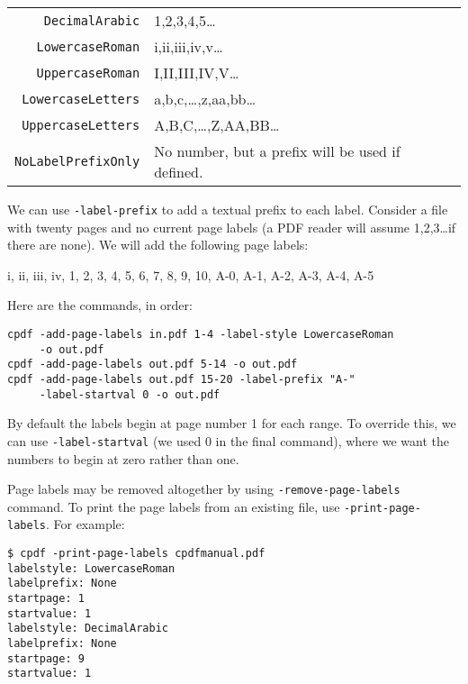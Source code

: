 \documentclass{book}
\begin{document}
\vspace{4mm}
{\small\begin{tabular}{rl}
  \texttt{DecimalArabic} & 1,2,3,4,5\ldots \\
  \texttt{LowercaseRoman} & i,ii,iii,iv,v\ldots \\
  \texttt{UppercaseRoman} & I,II,III,IV,V\ldots \\
  \texttt{LowercaseLetters} & a,b,c,\ldots,z,aa,bb\ldots \\
  \texttt{UppercaseLetters} & A,B,C,\ldots,Z,AA,BB\ldots \\
  \texttt{NoLabelPrefixOnly} & No number, but a prefix will be used if defined.
\end{tabular}}
\vspace{4mm}

\noindent We can use \texttt{-label-prefix} to add a textual prefix to each label. 
Consider a file with twenty pages and no current page labels (a PDF reader will assume 1,2,3\ldots if there are none). We will add the following page labels:

\vspace{4mm}
i, ii, iii, iv, 1, 2, 3, 4, 5, 6, 7, 8, 9, 10, A-0, A-1, A-2, A-3, A-4, A-5
\vspace{4mm}

\noindent Here are the commands, in order:

{\small\begin{framed}
  \noindent\verb!cpdf -add-page-labels in.pdf 1-4 -label-style LowercaseRoman!\\
  \noindent\verb!     -o out.pdf!\\
  
  \noindent\verb!cpdf -add-page-labels out.pdf 5-14 -o out.pdf!\\

  \noindent\verb!cpdf -add-page-labels out.pdf 15-20 -label-prefix "A-"!\\
  \noindent\verb!     -label-startval 0 -o out.pdf!
\end{framed}}

\noindent By default the labels begin at page number 1 for each range. To override this, we can use \texttt{-label-startval} (we used $0$ in the final command), where we want the numbers to begin at zero rather than one.

Page labels may be removed altogether by using \texttt{-remove-page-labels} command. To print the page labels from an existing file, use \texttt{-print-page-labels}. For example:
\begin{framed}\small\begin{verbatim}$ cpdf -print-page-labels cpdfmanual.pdf
labelstyle: LowercaseRoman
labelprefix: None
startpage: 1
startvalue: 1
labelstyle: DecimalArabic
labelprefix: None
startpage: 9
startvalue: 1
\end{verbatim}
\end{framed}\pagestyle{empty}\thispagestyle{fancy}
\end{document}
